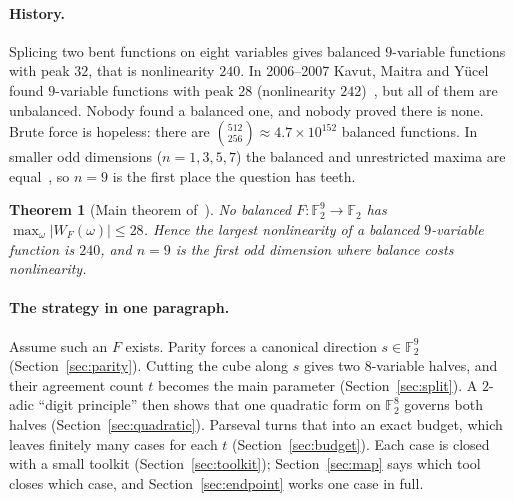 \documentclass[11pt]{article}
\newtheorem{theorem}{Theorem}[section]
\theoremstyle{definition}
\theoremstyle{remark}
\newcommand{\F}{\mathbb{F}}
\DeclareRobustCommand{\_}{\textunderscore\allowbreak}
\newcommand{\main}{\cite{Main}}
\begin{document}
\paragraph{History.} Splicing two bent functions on eight variables gives balanced $9$-variable functions with peak $32$, that is nonlinearity $240$. In 2006--2007 Kavut, Maitra and Y\"ucel found $9$-variable functions with peak $28$ (nonlinearity $242$)~\cite{KMY2006,KMY2007}, but all of them are unbalanced. Nobody found a balanced one, and nobody proved there is none. Brute force is hopeless: there are $\binom{512}{256}\approx 4.7\times10^{152}$ balanced functions. In smaller odd dimensions ($n=1,3,5,7$) the balanced and unrestricted maxima are equal~\main, so $n=9$ is the first place the question has teeth.

\begin{theorem}[Main theorem of~\main]
No balanced $F:\F_2^9\to\F_2$ has $\max_\omega|W_F(\omega)|\le 28$. Hence the largest nonlinearity of a balanced $9$-variable function is $240$, and $n=9$ is the first odd dimension where balance costs nonlinearity.
\end{theorem}

\paragraph{The strategy in one paragraph.} Assume such an $F$ exists. Parity forces a canonical direction $s\in\F_2^9$ (Section~\ref{sec:parity}). Cutting the cube along $s$ gives two $8$-variable halves, and their agreement count $t$ becomes the main parameter (Section~\ref{sec:split}). A $2$-adic ``digit principle'' then shows that one quadratic form on $\F_2^8$ governs both halves (Section~\ref{sec:quadratic}). Parseval turns that into an exact budget, which leaves finitely many cases for each $t$ (Section~\ref{sec:budget}). Each case is closed with a small toolkit (Section~\ref{sec:toolkit}); Section~\ref{sec:map} says which tool closes which case, and Section~\ref{sec:endpoint} works one case in full.
\end{document}
